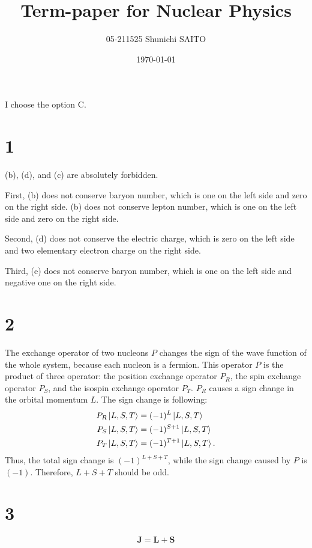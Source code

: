 \documentclass[a4paper,11pt]{jsarticle}
\begin{document}
\title{Term-paper for Nuclear Physics}
\author{05-211525 Shunichi SAITO}
\date{\today}
\maketitle

I choose the option C.

\section*{1}

(b), (d), and (c) are absolutely forbidden.

First, (b) does not conserve baryon number, which is one on the left side and zero on the right side. 
(b) does not conserve lepton number, which is one on the left side and zero on the right side.

Second, (d) does not conserve the electric charge, which is zero on the left side and 
two elementary electron charge on the right side.

Third, (e) does not conserve baryon number, which is one on the left side and negative one on the right side.


\section*{2}

The exchange operator of two nucleons $P$ changes the sign of the wave function of the whole system, because each nucleon is a fermion.
This operator $P$ is the product of three operator: the position exchange operator $P_R$, the spin exchange operator $P_S$, and the isospin exchange operator $P_T$.
$P_R$ causes a sign change in the orbital momentum $L$.
The sign change is following:
\begin{align}
  P_R \ket{L, S, T} &= (-1)^{L} \ket{L, S, T} \\
  P_S \ket{L, S, T} &= (-1)^{S+1} \ket{L, S, T} \\
  P_T \ket{L, S, T} &= (-1)^{T+1} \ket{L, S, T}.
\end{align}
Thus, the total sign change is $(-1)^{L+S+T}$, while the sign change caused by $P$ is $(-1)$.
Therefore, $L+S+T$ should be odd.

\section*{3}

\begin{equation}
  \mathbf{J} = \mathbf{L} + \mathbf{S}
\end{equation}
\end{document}
